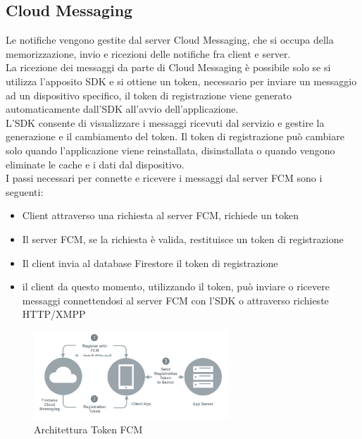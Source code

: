 \subsection{Cloud Messaging}
Le notifiche vengono gestite dal server Cloud Messaging, che si occupa della memorizzazione, invio e ricezioni delle notifiche fra client e server.\\
La ricezione dei messaggi da parte di Cloud Messaging è possibile solo se si utilizza l'apposito SDK e si ottiene un token, necessario per inviare un messaggio ad un dispositivo specifico, il token di registrazione viene generato automaticamente dall'SDK all'avvio dell'applicazione.\\
L'SDK consente di visualizzare i messaggi ricevuti dal servizio e gestire la generazione e il cambiamento del token. Il token di registrazione può cambiare solo quando l'applicazione viene reinstallata, disinstallata o quando vengono eliminate le cache e i dati dal dispositivo.\\
I passi necessari per connette e ricevere i messaggi dal server FCM sono i seguenti:
\begin{itemize}
    \item Client attraverso una richiesta al server FCM, richiede un token
    \item Il server FCM, se la richiesta è valida, restituisce un token di registrazione
    \item Il client invia al database Firestore il token di registrazione
    \item il client da questo momento, utilizzando il token, può inviare o ricevere messaggi connettendosi al server FCM con l'SDK o attraverso richieste HTTP/XMPP
\end{itemize}

\begin{figure}[!hb]
  \centering
  \includegraphics[width=0.65\textwidth]{immagini/fcm_token.png}
  \caption{Architettura Token FCM} \label{fig:Architettura Token FCM}
\end{figure}

